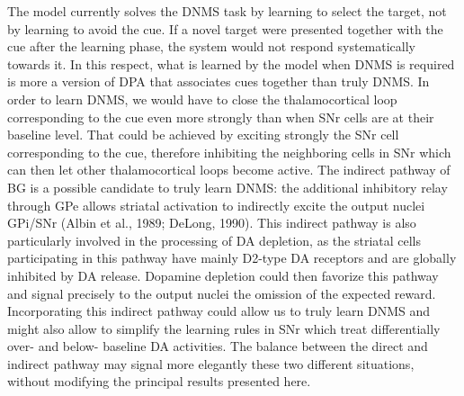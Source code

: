 \documentclass[
  11pt,
  a4paper,
]{scrbook}
\begin{document}
The model currently solves the DNMS task by learning to select the
target, not by learning to avoid the cue. If a novel target were
presented together with the cue after the learning phase, the system
would not respond systematically towards it. In this respect, what is
learned by the model when DNMS is required is more a version of DPA that
associates cues together than truly DNMS. In order to learn DNMS, we
would have to close the thalamocortical loop corresponding to the cue
even more strongly than when SNr cells are at their baseline level. That
could be achieved by exciting strongly the SNr cell corresponding to the
cue, therefore inhibiting the neighboring cells in SNr which can then
let other thalamocortical loops become active. The indirect pathway of
BG is a possible candidate to truly learn DNMS: the additional
inhibitory relay through GPe allows striatal activation to indirectly
excite the output nuclei GPi/SNr (Albin et al., 1989; DeLong, 1990).
This indirect pathway is also particularly involved in the processing of
DA depletion, as the striatal cells participating in this pathway have
mainly D2-type DA receptors and are globally inhibited by DA release.
Dopamine depletion could then favorize this pathway and signal precisely
to the output nuclei the omission of the expected reward. Incorporating
this indirect pathway could allow us to truly learn DNMS and might also
allow to simplify the learning rules in SNr which treat differentially
over- and below- baseline DA activities. The balance between the direct
and indirect pathway may signal more elegantly these two different
situations, without modifying the principal results presented here.
\end{document}
